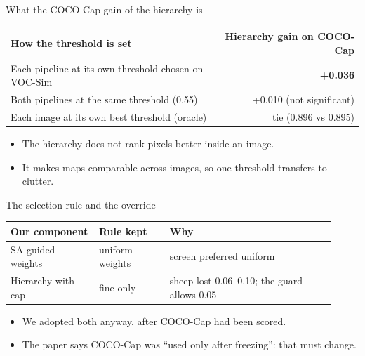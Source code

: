\documentclass[aspectratio=169,11pt]{beamer}
\begin{document}
\begin{frame}{What the COCO-Cap gain of the hierarchy is}
\begin{slidetable}
\begin{tabular}{@{}lr@{}}
\toprule
How the threshold is set & Hierarchy gain on COCO-Cap \\
\midrule
Each pipeline at its own threshold chosen on VOC-Sim & \textbf{+0.036} \\
Both pipelines at the same threshold (0.55) & +0.010 (not significant) \\
Each image at its own best threshold (oracle) & tie (0.896 vs 0.895) \\
\bottomrule
\end{tabular}
\end{slidetable}
\begin{itemize}
\item The hierarchy does not rank pixels better inside an image.
\item It makes maps comparable across images, so one threshold transfers to clutter.
\end{itemize}
\end{frame}

\begin{frame}{The selection rule and the override}
\begin{slidetable}
\begin{tabular}{@{}L{0.25\linewidth}L{0.20\linewidth}L{0.47\linewidth}@{}}
\toprule
Our component & Rule kept & Why \\
\midrule
SA-guided weights & uniform weights & screen preferred uniform \\
Hierarchy with cap & fine-only & sheep lost 0.06--0.10; the guard allows 0.05 \\
\bottomrule
\end{tabular}
\end{slidetable}
\begin{itemize}
\item We adopted both anyway, after COCO-Cap had been scored.
\item The paper says COCO-Cap was ``used only after freezing'': that must change.
\end{itemize}
\end{frame}
\end{document}
